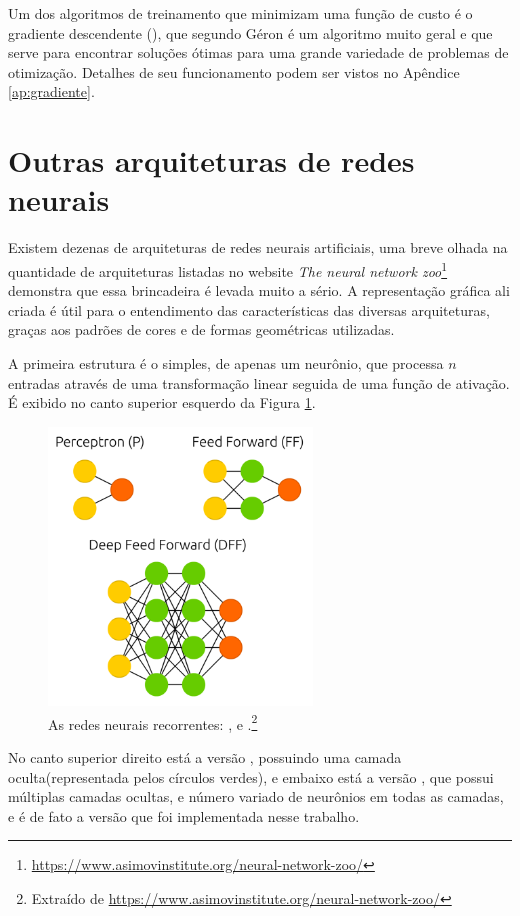 Um dos algoritmos de treinamento que minimizam uma função de custo é o gradiente descendente (), que segundo Géron \citep{hands} é um algoritmo muito geral e que serve para encontrar soluções ótimas para uma grande variedade de problemas de otimização. Detalhes de seu funcionamento podem ser vistos no Apêndice \ref{ap:gradiente}.

\section{Outras arquiteturas de redes neurais}

Existem dezenas de arquiteturas de redes neurais artificiais, uma breve olhada na quantidade de arquiteturas listadas no website \emph{The neural network zoo}\footnote{\url{https://www.asimovinstitute.org/neural-network-zoo/}} demonstra que essa brincadeira é levada muito a sério. A representação gráfica ali criada é útil para o entendimento das características das diversas arquiteturas, graças aos padrões de cores e de formas geométricas utilizadas.

A primeira estrutura é o  simples, de apenas um neurônio, que processa $n$ entradas através de uma transformação linear seguida de uma função de ativação. É exibido no canto superior esquerdo da Figura \ref{fig:estrutura_p}.

\begin{figure}[htb]
\centering
\includegraphics[width=7cm]{figuras/estrutura_p}
\caption{As redes neurais recorrentes: ,  e .\footnote{Extraído de \url{https://www.asimovinstitute.org/neural-network-zoo/}}}
\label{fig:estrutura_p}
\end{figure}

No canto superior direito está a versão , possuindo uma camada oculta(representada pelos círculos verdes), e embaixo está a versão , que possui múltiplas camadas ocultas, e número variado de neurônios em todas as camadas, e é de fato a versão que foi implementada nesse trabalho.

